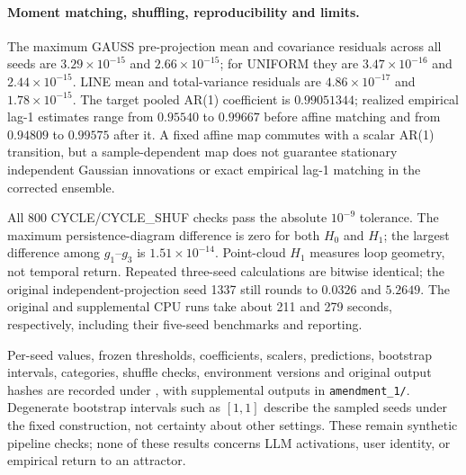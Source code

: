 \paragraph{Moment matching, shuffling, reproducibility and limits.}
The maximum GAUSS pre-projection mean and covariance residuals across all seeds
are $3.29\times10^{-15}$ and $2.66\times10^{-15}$; for UNIFORM they are
$3.47\times10^{-16}$ and $2.44\times10^{-15}$. LINE mean and total-variance
residuals are $4.86\times10^{-17}$ and $1.78\times10^{-15}$.
The target pooled AR(1) coefficient is $0.99051344$; realized empirical lag-1
estimates range from $0.95540$ to $0.99667$ before affine matching and from
$0.94809$ to $0.99575$ after it. A fixed affine map commutes with a scalar AR(1)
transition, but a sample-dependent map does not guarantee stationary independent
Gaussian innovations or exact empirical lag-1 matching in the corrected ensemble.

All 800 CYCLE/CYCLE\_SHUF checks pass the absolute $10^{-9}$ tolerance.
The maximum persistence-diagram difference is zero for both $H_0$ and $H_1$;
the largest difference among $g_1$--$g_3$ is $1.51\times10^{-14}$.
Point-cloud $H_1$ measures loop geometry, not temporal return.
Repeated three-seed calculations are bitwise identical; the original
independent-projection seed 1337 still rounds to $0.0326$ and $5.2649$.
The original and supplemental CPU runs take about 211 and 279 seconds,
respectively, including their five-seed benchmarks and reporting.

Per-seed values, frozen thresholds, coefficients, scalers, predictions,
bootstrap intervals, categories, shuffle checks, environment versions and original
output hashes are recorded under
, with supplemental outputs in
\texttt{amendment\_1/}. Degenerate bootstrap intervals such as $[1,1]$ describe
the sampled seeds under the fixed construction, not certainty about other
settings. These remain synthetic pipeline checks; none of these results concerns
LLM activations, user identity, or empirical return to an attractor.
\clearpage
\endgroup
